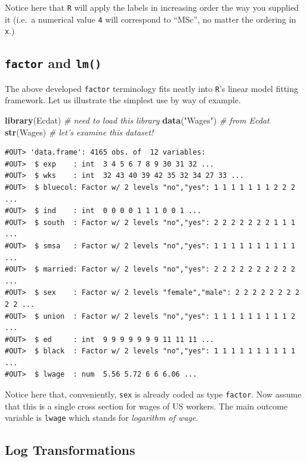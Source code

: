 \documentclass[]{book}
\newenvironment{Shaded}{\begin{snugshade}}{\end{snugshade}}
\newcommand{\KeywordTok}[1]{\textcolor[rgb]{0.13,0.29,0.53}{\textbf{#1}}}
\newcommand{\StringTok}[1]{\textcolor[rgb]{0.31,0.60,0.02}{#1}}
\newcommand{\CommentTok}[1]{\textcolor[rgb]{0.56,0.35,0.01}{\textit{#1}}}
\newcommand{\NormalTok}[1]{#1}
\theoremstyle{definition}
\theoremstyle{definition}
\theoremstyle{definition}
\theoremstyle{remark}
\begin{document}
Notice here that \texttt{R} will apply the labels in increasing order
the way you supplied it (i.e.~a numerical value \texttt{4} will
correspond to ``MSc'', no matter the ordering in \texttt{x}.)

\subsection{\texorpdfstring{\texttt{factor} and
\texttt{lm()}}{factor and lm()}}\label{factor-and-lm}

The above developed \texttt{factor} terminology fits neatly into
\texttt{R}'s linear model fitting framework. Let us illustrate the
simplest use by way of example.

\begin{Shaded}
\begin{Highlighting}[]
\KeywordTok{library}\NormalTok{(Ecdat)  }\CommentTok{# need to load this library}
\KeywordTok{data}\NormalTok{(}\StringTok{"Wages"}\NormalTok{)   }\CommentTok{# from Ecdat}
\KeywordTok{str}\NormalTok{(Wages)   }\CommentTok{# let's examine this dataset!}
\end{Highlighting}
\end{Shaded}

\begin{verbatim}
#OUT> 'data.frame': 4165 obs. of  12 variables:
#OUT>  $ exp    : int  3 4 5 6 7 8 9 30 31 32 ...
#OUT>  $ wks    : int  32 43 40 39 42 35 32 34 27 33 ...
#OUT>  $ bluecol: Factor w/ 2 levels "no","yes": 1 1 1 1 1 1 1 2 2 2 ...
#OUT>  $ ind    : int  0 0 0 0 1 1 1 0 0 1 ...
#OUT>  $ south  : Factor w/ 2 levels "no","yes": 2 2 2 2 2 2 2 1 1 1 ...
#OUT>  $ smsa   : Factor w/ 2 levels "no","yes": 1 1 1 1 1 1 1 1 1 1 ...
#OUT>  $ married: Factor w/ 2 levels "no","yes": 2 2 2 2 2 2 2 2 2 2 ...
#OUT>  $ sex    : Factor w/ 2 levels "female","male": 2 2 2 2 2 2 2 2 2 2 ...
#OUT>  $ union  : Factor w/ 2 levels "no","yes": 1 1 1 1 1 1 1 1 1 2 ...
#OUT>  $ ed     : int  9 9 9 9 9 9 9 11 11 11 ...
#OUT>  $ black  : Factor w/ 2 levels "no","yes": 1 1 1 1 1 1 1 1 1 1 ...
#OUT>  $ lwage  : num  5.56 5.72 6 6 6.06 ...
\end{verbatim}

Notice here that, conveniently, \texttt{sex} is already coded as type
\texttt{factor}. Now assume that this is a single cross section for
wages of US workers. The main outcome variable is \texttt{lwage} which
stands for \emph{logarithm of wage}.

\subsection{Log Transformations}\label{log-transformations}
\end{document}
